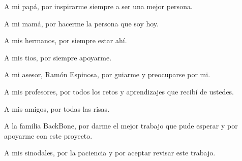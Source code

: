 \documentclass[11pt]{book}
\begin{document}
A mi papá, por inspirarme siempre a ser una mejor persona.

A mi mamá, por hacerme la persona que soy hoy.

A mis hermanos, por siempre estar ahí.

A mis tios, por siempre apoyarme. 

A mi asesor, Ramón Espinosa, por guiarme y preocuparse por mi. 

A mis profesores, por todos los retos y aprendizajes que recibí de ustedes.

A mis amigos, por todas las risas. 

A la familia BackBone, por darme el mejor trabajo que pude esperar y por apoyarme con este proyecto. 

A mis sinodales, por la paciencia y por aceptar revisar este trabajo.  
\end{document}
